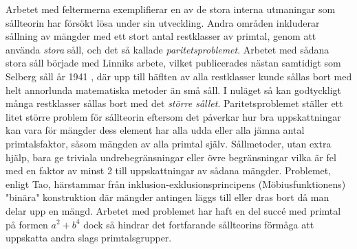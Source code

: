 Arbetet med feltermerna exemplifierar en av de stora interna utmaningar som sållteorin har försökt lösa under sin utveckling.
Andra områden inkluderar sållning av mängder med ett stort antal restklasser av primtal, genom att använda \textit{stora} såll, och det så kallade \textit{paritetsproblemet}. Arbetet med sådana stora såll började med Linniks arbete, vilket publicerades nästan samtidigt som Selberg såll år 1941 \cite[s. 135]{cojocarumurty}, där upp till häflten av alla restklasser kunde sållas bort med helt annorlunda matematiska metoder än små såll. 
I nuläget så kan godtyckligt många restklasser sållas bort med det \textit{större sållet}.
Paritetsproblemet ställer ett litet större problem för sållteorin eftersom det påverkar hur bra uppskattningar kan vara för mängder dess element har alla udda eller alla jämna antal primtalsfaktor, såsom mängden av alla primtal själv.
Sållmetoder, utan extra hjälp, bara ge triviala undrebegränsningar eller övre begränsningar vilka är fel med en faktor av minst 2 till uppskattningar av sådana mängder.
Problemet, enligt Tao, härstammar från inklusion-exklusionsprincipens (Möbiusfunktionens) "binära" konstruktion där mängder antingen läggs till eller dras bort då man delar upp en mängd.
Arbetet med problemet har haft en del succé med primtal på formen \(a^2 + b^4\) \cite{abPrimes} dock så hindrar det fortfarande sållteorins förmåga att uppskatta andra slags primtalsgrupper.